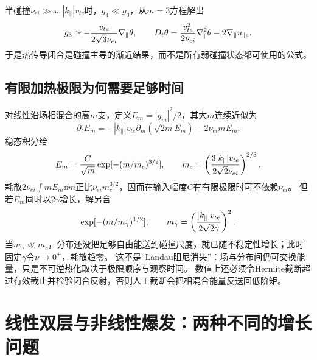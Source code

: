 半碰撞$\nu_{ei}\gg\omega,|k_\parallel|v_{te}$时，$g_4\ll g_3$，从$m=3$方程解出
\begin{equation}
 g_3\simeq-{v_{te}\over2\sqrt3\nu_{ei}}\nabla_\parallel\theta,\qquad
 D_t\theta={v_{te}^2\over2\nu_{ei}}\nabla_\parallel^2\theta-2\nabla_\parallel u_{\parallel e}.
\end{equation}
于是热传导闭合是碰撞主导的渐近结果，而不是所有弱碰撞状态都可使用的公式。

\subsection{有限加热极限为何需要足够时间}
对线性沿场相混合的高$m$支，定义$E_m=|g_m|^2/2$，其大$m$连续近似为
\begin{equation}
 \partial_tE_m=-|k_\parallel|v_{te}\partial_m(\sqrt{2m}E_m)-2\nu_{ei}mE_m.
\end{equation}
稳态积分给
\begin{equation}
 E_m={C\over\sqrt m}\exp[-(m/m_c)^{3/2}],\qquad
 m_c=\left({3|k_\parallel|v_{te}\over2\sqrt2\nu_{ei}}\right)^{2/3}.
\end{equation}
耗散$2\nu_{ei}\int mE_m\dd m$正比$\nu_{ei}m_c^{3/2}$，因而在输入幅度$C$有有限极限时可不依赖$\nu_{ei}$。
但若$E_m$同时以$2\gamma$增长，解另含
\begin{equation}
 \exp[-(m/m_\gamma)^{1/2}],\qquad
 m_\gamma=\left({|k_\parallel|v_{te}\over2\sqrt2\gamma}\right)^2.
\end{equation}
当$m_\gamma\ll m_c$，分布还没把足够自由能送到碰撞尺度，就已随不稳定性增长；此时固定$\gamma$令$\nu\to0^+$，耗散趋零。
这不是“Landau阻尼消失”：场与分布间仍可交换能量，只是不可逆热化取决于极限顺序与观察时间。
数值上还必须令Hermite截断超过有效截止并检验闭合反射，否则人工截断会把相混合能量反送回低阶矩。

\section{线性双层与非线性爆发：两种不同的增长问题}
